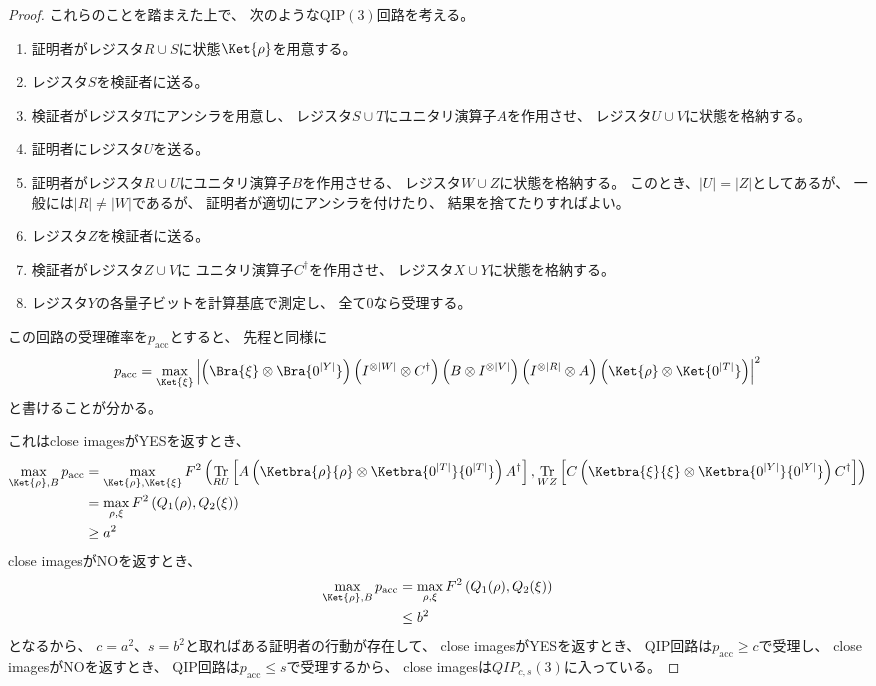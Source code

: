 \documentclass[a4paper, 10pt]{jsarticle}
\DeclareMathOperator{\Tr}{Tr}
\begin{document}
\begin{proof}
	これらのことを踏まえた上で、
	次のような$\mathrm{QIP}(3)$回路を考える。
	\begin{enumerate}
		\item 証明者がレジスタ$R \cup S$に状態$\Ket{\rho}$を用意する。
		\item レジスタ$S$を検証者に送る。
		\item 検証者がレジスタ$T$にアンシラを用意し、
		レジスタ$S \cup T$にユニタリ演算子$A$を作用させ、
		レジスタ$U \cup V$に状態を格納する。
		\item 証明者にレジスタ$U$を送る。
		\item 証明者がレジスタ$R \cup U$にユニタリ演算子$B$を作用させる、
		レジスタ$W \cup Z$に状態を格納する。
		このとき、$|U| = |Z|$としてあるが、
		一般には$|R| \neq |W|$であるが、
		証明者が適切にアンシラを付けたり、
		結果を捨てたりすればよい。
		\item レジスタ$Z$を検証者に送る。
		\item 検証者がレジスタ$Z \cup V$に
		ユニタリ演算子$C^\dagger$を作用させ、
		レジスタ$X \cup Y$に状態を格納する。
		\item レジスタ$Y$の各量子ビットを計算基底で測定し、
		全て0なら受理する。
	\end{enumerate}
	この回路の受理確率を$p_{\mathrm{acc}}$とすると、
	先程と同様に
	\begin{align}
		p_{\mathrm{acc}} = \max_{\Ket{\xi}} \left|
			\left( \Bra{\xi} \otimes \Bra{0^{|Y|}} \right)
			\left( I^{\otimes |W|} \otimes C^\dagger \right)
			\left( B \otimes I^{\otimes |V|} \right)
			\left( I^{\otimes |R|} \otimes A \right)
			\left( \Ket{\rho} \otimes \Ket{0^{|T|}} \right)
		\right|^2
	\end{align}
	と書けることが分かる。
	
	これはclose imagesがYESを返すとき、
	\begin{align}
		\max_{\Ket{\rho}, B} p_{\mathrm{acc}}
		&= \max_{\Ket{\rho}, \Ket{\xi}} F^2 \left(
			\Tr_{RU} \left[ A \left( \Ketbra{\rho}{\rho} \otimes
			\Ketbra{0^{|T|}}{0^{|T|}} \right) A^\dagger \right],
			\Tr_{WZ} \left[ C \left( \Ketbra{\xi}{\xi} \otimes
			\Ketbra{0^{|Y|}}{0^{|Y|}} \right) C^\dagger \right]
		\right) \\
		&= \max_{\rho, \xi} F^2 \left( Q_1(\rho), Q_2(\xi) \right) \\
		&\geq a^2
	\end{align}
	close imagesがNOを返すとき、
	\begin{align}
		\max_{\Ket{\rho}, B} p_{\mathrm{acc}}
		&= \max_{\rho, \xi} F^2 \left( Q_1(\rho), Q_2(\xi) \right) \\
		&\leq b^2
	\end{align}
	となるから、
	$c = a^2$、$s = b^2$と取ればある証明者の行動が存在して、
	close imagesがYESを返すとき、
	QIP回路は$p_{\mathrm{acc}} \geq c$で受理し、
	close imagesがNOを返すとき、
	QIP回路は$p_{\mathrm{acc}} \leq s$で受理するから、
	close imagesは$QIP_{c, s}(3)$に入っている。
\end{proof}
\end{document}
